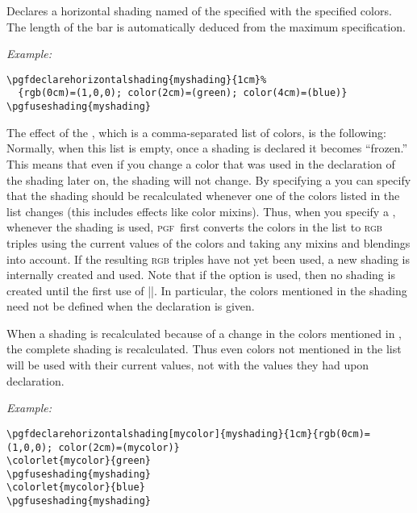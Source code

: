 \documentclass{ltxdoc}
\def\pgf{\textsc{pgf}}
\def\example{\par\smallskip\noindent\textit{Example: }}
\newcommand\opt[1]{{\color{black!50!green}#1}}
\renewcommand\oarg[1]{\opt{{\ttfamily[}\meta{#1}{\ttfamily]}}}
\begin{document}
\begin{command}{\pgfdeclarehorizontalshading\oarg{color list}}
  Declares a horizontal shading named  of the specified
   with the specified colors. The length of the bar is
  automatically deduced from the maximum specification.
  \example


\begin{verbatim}
\pgfdeclarehorizontalshading{myshading}{1cm}%
  {rgb(0cm)=(1,0,0); color(2cm)=(green); color(4cm)=(blue)}
\pgfuseshading{myshading}
\end{verbatim}

  The effect of the , which is a
  comma-separated list of colors, is the following: Normally, when
  this list is empty, once a shading is declared it becomes
  ``frozen.'' This means that even if you change a color that was used
  in the declaration of the shading later on, the shading will not
  change. By specifying a  you can specify
  that the shading should be recalculated whenever one of the colors
  listed in the list changes (this includes effects like color
  mixins). Thus, when you specify a ,
  whenever the shading is used, \pgf\ first converts the colors in the
  list to \textsc{rgb} triples using the current values of the
  colors and taking any mixins and blendings into account. If the
  resulting \textsc{rgb} triples have not yet been   used, a new
  shading is internally created and used. Note that if the 
  option  is used, then no shading is created until
  the first use of |\pgfuseshading|. In particular, the colors
  mentioned in the shading need not be defined when the declaration is
  given.

  When a shading is recalculated because of a change in the
  colors mentioned in , the complete shading
  is recalculated. Thus even colors not mentioned in the list will be
  used with their current values, not with the values they had upon
  declaration. 
  \example
{}

\begin{verbatim}
\pgfdeclarehorizontalshading[mycolor]{myshading}{1cm}{rgb(0cm)=(1,0,0); color(2cm)=(mycolor)}
\colorlet{mycolor}{green}
\pgfuseshading{myshading}
\colorlet{mycolor}{blue}
\pgfuseshading{myshading}
\end{verbatim}
\end{command}
\end{document}
